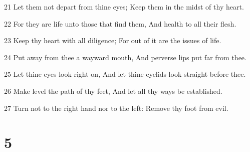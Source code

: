 \par 21 Let them not depart from thine eyes; Keep them in the midst of thy heart.
\par 22 For they are life unto those that find them, And health to all their flesh.
\par 23 Keep thy heart with all diligence; For out of it are the issues of life.
\par 24 Put away from thee a wayward mouth, And perverse lips put far from thee.
\par 25 Let thine eyes look right on, And let thine eyelids look straight before thee.
\par 26 Make level the path of thy feet, And let all thy ways be established.
\par 27 Turn not to the right hand nor to the left: Remove thy foot from evil.

\chapter{5}

